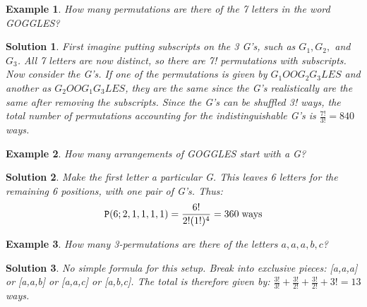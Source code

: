 \documentclass[12pt, letterpaper, onecolumn, conference, final]{IEEEtran}
\theoremstyle{definition}
\newtheorem{definition}{Definition}[section]
\theoremstyle{plain}
\newtheorem{example}{Example}[section]
\newtheorem{solution}{Solution}[section]
\begin{document}
\begin{example}
How many permutations are there of the 7 letters in the word GOGGLES? 
\end{example}
\begin{solution}
First imagine putting subscripts on the 3 G's, such as $G_1, G_2,$ and $G_3$. All 7 letters are now distinct, so there are 7! permutations with subscripts. Now consider the G's. If one of the permutations is given by $G_1OOG_2G_3LES$ and another as $G_2OOG_1G_3LES$, they are the same since the G's realistically are the same after removing the subscripts. Since the G's can be shuffled 3! ways, the total number of permutations accounting for the indistinguishable G's is $\frac{7!}{3!} = 840$ ways.
\end{solution}

\begin{center}
\end{center}

\begin{example}
How many arrangements of GOGGLES start with a G?
\end{example}
\begin{solution}
Make the first letter a particular G. This leaves 6 letters for the remaining 6 positions, with one pair of G's. Thus:
\begin{equation*}
\mathtt{P}(6;2,1,1,1,1) = \frac{6!}{2!(1!)^4} = 360 \hspace{.1cm} \text{ways}
\end{equation*}
\end{solution}

\begin{example}
How many 3-permutations are there of the letters $a,a,a,b,c$?
\end{example}
\begin{solution}
No simple formula for this setup. Break into exclusive pieces: [a,a,a] or [a,a,b] or [a,a,c] or [a,b,c]. The total is therefore given by: $\frac{3!}{3!} + \frac{3!}{2!} + \frac{3!}{2!} + 3! = 13$ ways.
\end{solution}
\end{document}
